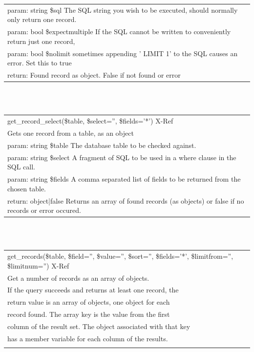 \documentclass[a4paper]{report}  %
\begin{document}
\begin{tt}
\begin{center}
\begin{tabular}{| p{12cm} |}
	\\
	param: string \$sql The SQL string you wish to be executed, should normally only return one record.\\
	param: bool \$expectmultiple If the SQL cannot be written to conveniently return just one record,\\
	param: bool \$nolimit sometimes appending ' LIMIT 1' to the SQL causes an error. Set this to true\\
	return: Found record as object. False if not found or error\\
	\hline
	\end{tabular}
	\     \ \\ \     \ \\
   \begin{tabular}{| p{12cm} |} 
	\hline
	\rowcolor[gray]{0.5}get\_record\_select(\$table, \$select='', \$fields='*') X-Ref\\
	Gets one record from a table, as an object\\
	\hline
	param: string \$table The database table to be checked against.\\
	param: string \$select A fragment of SQL to be used in a where clause in the SQL call.\\
	param: string \$fields A comma separated list of fields to be returned from the chosen table.\\
	return: object|false Returns an array of found records (as objects) or false if no records or error occured.\\
	\hline
	\end{tabular}
	\     \ \\ \     \ \\
   \begin{tabular}{| p{12cm} |} 
	\hline
	\rowcolor[gray]{0.5}get\_records(\$table, \$field='', \$value='', \$sort='', \$fields='*', \$limitfrom='', \$limitnum='') X-Ref\\
	Get a number of records as an array of objects.\\
	\hline
	If the query succeeds and returns at least one record, the\\
	return value is an array of objects, one object for each\\
	record found. The array key is the value from the first\\
	column of the result set. The object associated with that key\\
	has a member variable for each column of the results.\\
	\\

\end{tabular}
\end{center}
\end{tt}
\end{document}

